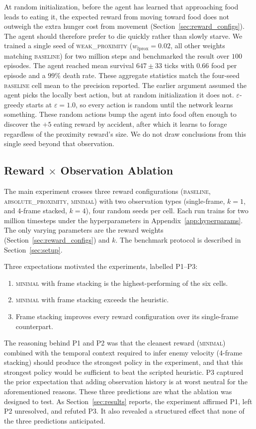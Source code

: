 \documentclass[12pt,a4paper,titlepage]{article}
\begin{document}
At random initialization, before the agent has learned that approaching food leads to eating it, the expected reward from moving toward food does not outweigh the extra hunger cost from movement (Section~\ref{sec:reward_configs}). The agent should therefore prefer to die quickly rather than slowly starve. We trained a single seed of \textsc{weak\_proximity} ($w_\text{fprox}=0.02$, all other weights matching \textsc{baseline}) for two million steps and benchmarked the result over $100$ episodes. The agent reached mean survival $647 \pm 33$ ticks with $0.66$ food per episode and a $99\%$ death rate. These aggregate statistics match the four-seed \textsc{baseline} cell mean to the precision reported. The earlier argument assumed the agent picks the locally best action, but at random initialization it does not. $\varepsilon$-greedy starts at $\varepsilon = 1.0$, so every action is random until the network learns something. These random actions bump the agent into food often enough to discover the $+5$ eating reward by accident, after which it learns to forage regardless of the proximity reward's size. We do not draw conclusions from this single seed beyond that observation.

\subsection{Reward $\times$ Observation Ablation}
\label{sec:ablation}

The main experiment crosses three reward configurations (\textsc{baseline}, \textsc{absolute\_proximity}, \textsc{minimal}) with two observation types (single-frame, $k = 1$, and 4-frame stacked, $k = 4$), four random seeds per cell. Each run trains for two million timesteps under the hyperparameters in Appendix~\ref{app:hyperparams}. The only varying parameters are the reward weights (Section~\ref{sec:reward_configs}) and $k$. The benchmark protocol is described in Section~\ref{sec:setup}.

Three expectations motivated the experiments, labelled P1--P3:
\begin{enumerate}[label=(P\arabic*),nosep,leftmargin=2.8em]
  \item \textsc{minimal} with frame stacking is the highest-performing of the six cells.
  \item \textsc{minimal} with frame stacking exceeds the heuristic.
  \item Frame stacking improves every reward configuration over its single-frame counterpart.
\end{enumerate}
The reasoning behind P1 and P2 was that the cleanest reward (\textsc{minimal}) combined with the temporal context required to infer enemy velocity (4-frame stacking) should produce the strongest policy in the experiment, and that this strongest policy would be sufficient to beat the scripted heuristic. P3 captured the prior expectation that adding observation history is at worst neutral for the aforementioned reasons. These three predictions are what the ablation was designed to test. As Section~\ref{sec:results} reports, the experiment affirmed P1, left P2 unresolved, and refuted P3. It also revealed a structured effect that none of the three predictions anticipated.
\end{document}
